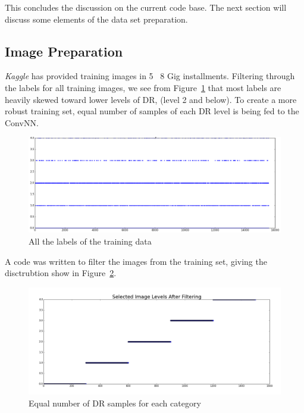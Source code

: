 \documentclass[letterpaper,12pt]{article}
\newcommand{\figref}[1]{Figure~\ref{#1}}
\begin{document}
This concludes the discussion on the current code base. The next section will discuss some elements of the data set preparation.

\subsection{Image Preparation}
\textit{Kaggle} has provided training images in  5 ~8 Gig installments. Filtering through the labels for all training images, we see from \figref{fullSample} that most labels are heavily skewed toward lower levels of DR, (level 2 and below). To create a more robust training set, equal number of samples of each DR level is being fed to the ConvNN. 

\begin{figure}[htbp]
\begin{center}
\includegraphics[scale=0.25]{images/FullSample.png}
\caption{All the labels of the training data}
\label{fullSample}
\end{center}
\end{figure}

A code was written to filter the images from the training set, giving the disctrubtion show in \figref{filtered}.

\begin{figure}[htbp]
\begin{center}
\includegraphics[scale=0.25]{images/After_filtering.png}
\caption{Equal number of DR samples for each category}
\label{filtered}
\end{center}
\end{figure}
\end{document}
